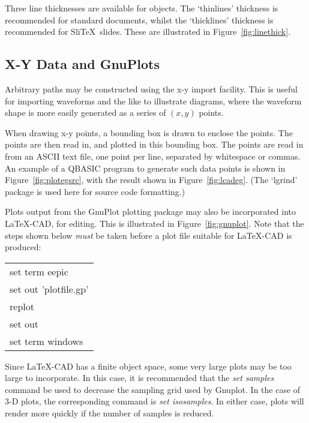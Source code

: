 \documentclass[a4paper]{article}
\begin{document}
Three line thicknesses are available for objects. The `thinlines'
thickness is recommended for standard documents, whilst the `thicklines'
thickness is recommended for Sli\TeX\ slides. These are illustrated in
Figure~\ref{fig:linethick}.



\subsection{ X-Y Data and GnuPlots }
\label{sec:xygnu}
Arbitrary paths may be constructed using the x-y import facility.
This is useful for importing waveforms and the like to illustrate
diagrams, where the waveform shape is more easily generated as
a series of $(x,y)$ points. 

When drawing x-y points, a bounding box is drawn to enclose the
points. The points are then read in, and plotted in this bounding
box. The points are read in from an ASCII text file, one point
per line, separated by whitespace or commas. An example of a
QBASIC program to generate such data points is shown in
Figure~\ref{fig:plotegsrc}, with the result shown in Figure~\ref{fig:lcadeg}.
(The `lgrind' package is used here for source code formatting.)


Plots output from the GnuPlot plotting package may also be
incorporated into LaTeX-CAD, for editing. This is illustrated in
Figure~\ref{fig:gnuplot}. Note that the steps shown below
\textit{must} be taken before a plot file suitable for LaTeX-CAD is
produced:
\begin{center}
\begin{tabular}{l}
	set term eepic  \\
	set out 'plotfile.gp'  \\
	replot  \\
	set out \\
	set term windows \\
\end{tabular}
\end{center}
	
Since LaTeX-CAD has a finite object space, some very large plots
may be too large to incorporate. In this case, it is recommended
that the \textit{set samples} command be used to decrease the sampling
grid used by Gnuplot. In the case of 3-D plots, the corresponding
command is \textit{set isosamples}. In either case, plots will render
more quickly if the number of samples is reduced.
	
\end{document}
